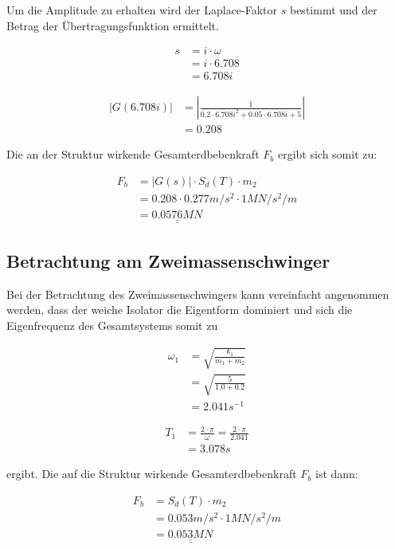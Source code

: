 Um die Amplitude zu erhalten wird der Laplace-Faktor $s$ bestimmt und der Betrag der Übertragungsfunktion ermittelt.

\begin{align*}
s &= i \cdot \omega\\
  &= i \cdot 6.708\\
  &= 6.708i
\end{align*}

\begin{align*}
|G(6.708i)| &= |\frac{1}{0.2 \cdot 6.708i^2 + 0.05 \cdot 6.708i + 5}|\\
            &= 0.208
\end{align*}

Die an der Struktur wirkende Gesamterdbebenkraft $F_b$ ergibt sich somit zu:

\begin{align*}
F_b &= |G(s)| \cdot S_d(T) \cdot m_2\\
    &= 0.208 \cdot 0.277 m/s^2 \cdot 1 MN/s^2/m\\
    &= \underline{\underline{0.0576 MN}}
\end{align*}

\subsection{Betrachtung am Zweimassenschwinger}

Bei der Betrachtung des Zweimassenschwingers kann vereinfacht angenommen werden, dass der weiche Isolator die Eigentform dominiert \cite{AKK} und sich die Eigenfrequenz des Gesamtsystems somit zu

\begin{align*}
\omega_1 &= \sqrt{\frac{k_1}{m_1 + m_2}}\\
         &= \sqrt{\frac{5}{1.0 + 0.2}}\\
         &= 2.041 s^{-1}
\end{align*}

\begin{align*}
T_1 &= \frac{2 \cdot \pi}{\omega} = \frac{2 \cdot \pi}{2.041}\\
    &= 3.078 s
\end{align*}

ergibt. Die auf die Struktur wirkende Gesamterdbebenkraft $F_b$ ist dann:

\begin{align*}
F_b &= S_d(T) \cdot m_2\\
    &= 0.053 m/s^2 \cdot 1 MN/s^2/m\\
    &= \underline{\underline{0.053 MN}}
\end{align*}


